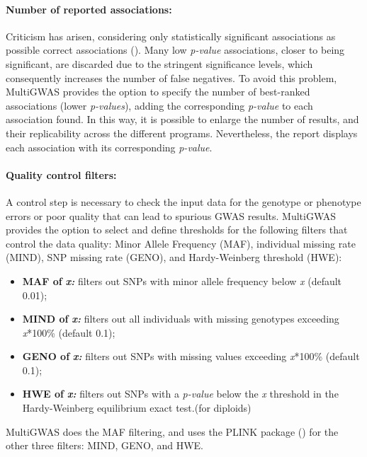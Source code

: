 \documentclass{article}
\begin{document}
\paragraph{Number of reported associations: }

Criticism has arisen, considering only statistically significant associations as possible correct associations (\cite{Thomson2011, Kaler2019}). Many low \emph{p-value} associations, closer to being significant, are discarded due to the stringent significance levels, which consequently increases the number of false negatives. To avoid this problem, MultiGWAS provides the option to specify the number of best-ranked associations (lower \emph{p-values}), adding the corresponding \emph{p-value} to each association found. In this way, it is possible to enlarge the number of results, and their replicability across the different programs. Nevertheless, the report displays each association with its corresponding \emph{p-value}.


\paragraph{Quality control filters:}

A control step is necessary to check the input data for the genotype or phenotype errors or poor quality that can lead to spurious GWAS results. MultiGWAS provides the option to select and define thresholds for the following filters that control the data quality: Minor Allele Frequency (MAF), individual missing rate (MIND), SNP missing rate (GENO), and Hardy-Weinberg threshold (HWE):
\begin{itemize}
\item \textbf{MAF of }\textbf{\emph{x:}} filters out SNPs with minor allele frequency below \emph{x} (default 0.01); 
\item \textbf{MIND of }\textbf{\emph{x:}} filters out all individuals with missing genotypes exceeding \emph{x}{*}100\% (default 0.1); 
\item \textbf{GENO of }\textbf{\emph{x:}} filters out SNPs with missing values exceeding \emph{x}{*}100\% (default 0.1); 
\item \textbf{HWE of }\textbf{\emph{x:}} filters out SNPs with a \emph{p-value} below the \emph{x} threshold in the Hardy-Weinberg equilibrium exact test.(for diploids)

\end{itemize}
MultiGWAS does the MAF filtering, and uses the PLINK package (\cite{Gumpinger2018}) for the other three filters: MIND, GENO, and HWE.
\end{document}
